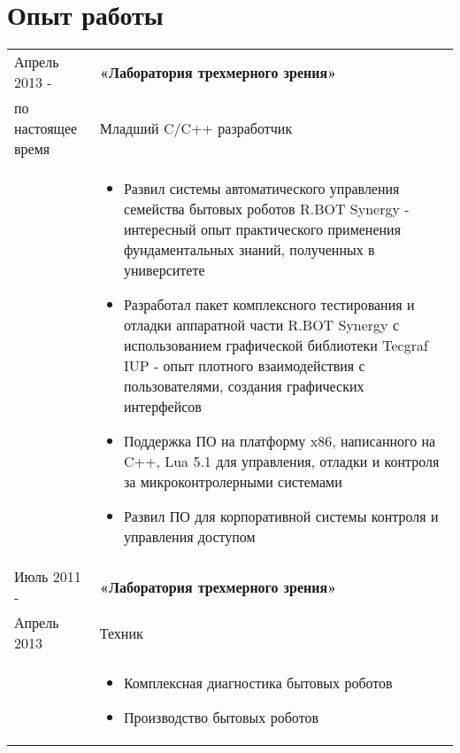\documentclass[a4paper, 11pt]{article}
\begin{document}
\section{Опыт работы}
\begin{tabular}{p{25mm}|p{110mm}}
    Апрель 2013 -       & \textbf{«Лаборатория трехмерного зрения»}                 \\
    по настоящее время  & Младший C/C++ разработчик                                 \\
                        &
    \begin{itemize}
        \item   Развил системы автоматического управления семейства бытовых
                роботов R.BOT Synergy - интересный опыт практического применения
                фундаментальных знаний, полученных в университете
        \item   Разработал пакет комплексного тестирования и отладки аппаратной части
                R.BOT Synergy с использованием графической библиотеки Tecgraf IUP
                - опыт плотного взаимодействия с пользователями, создания графических
                интерфейсов
        \item   Поддержка ПО на платформу x86, написанного на C++, Lua 5.1
                для управления, отладки и контроля за микроконтролерными системами
        \item   Развил ПО для корпоративной системы контроля и управления доступом
    \end{itemize}                                                                   \\

    Июль 2011 - & \textbf{«Лаборатория трехмерного зрения»}                         \\
    Апрель 2013 & Техник                                                            \\
                &
    \begin{itemize}
        \item   Комплексная диагностика бытовых роботов
        \item   Производство бытовых роботов
    \end{itemize}                                                                   \\

\end{tabular}
\end{document}
